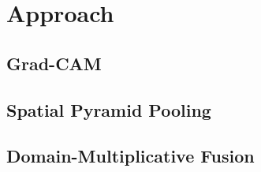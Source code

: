 \documentclass[../main.tex]{subfiles}
\begin{document}
    \section{Approach}
    \subsection{Grad-CAM}
    \subsection{Spatial Pyramid Pooling}
    \subsection{Domain-Multiplicative Fusion}
\end{document}
